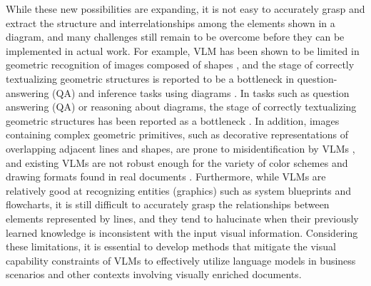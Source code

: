 While these new possibilities are expanding, it is not easy to accurately grasp and extract the structure and interrelationships among the elements shown in a diagram, and many challenges still remain to be overcome before they can be implemented in actual work. 
For example, VLM has been shown to be limited in geometric recognition of images composed of shapes \citep{kamoi_visonlyqa_2024, zhang_mathverse_2024, yue_mmmu_2024}, and the stage of correctly textualizing geometric structures is reported to be a bottleneck in question-answering (QA) and inference tasks using diagrams \citep{ye_beyond_2024}.
In tasks such as question answering (QA) or reasoning about diagrams, the stage of correctly textualizing geometric structures has been reported as a bottleneck \citep{ye_beyond_2024}.
In addition, images containing complex geometric primitives, such as decorative representations of overlapping adjacent lines and shapes, are prone to misidentification by VLMs \citep{rahmanzadehgervi_vision_2024}, and existing VLMs are not robust enough for the variety of color schemes and drawing formats found in real documents \citep{ye_beyond_2024, singh_flowvqa_2024, tannert_flowchartqa_2023}.
Furthermore, while VLMs are relatively good at recognizing entities (graphics) such as system blueprints and flowcharts, it is still difficult to accurately grasp the relationships between elements represented by lines\citep{giledereli_vision-language_2024}, and they tend to halucinate when their previously learned knowledge is inconsistent with the input visual information\citep{mukhopadhyay_unraveling_2024, giledereli_vision-language_2024}.
Considering these limitations, it is essential to develop methods that mitigate the visual capability constraints of VLMs to effectively utilize language models in business scenarios and other contexts involving visually enriched documents.

